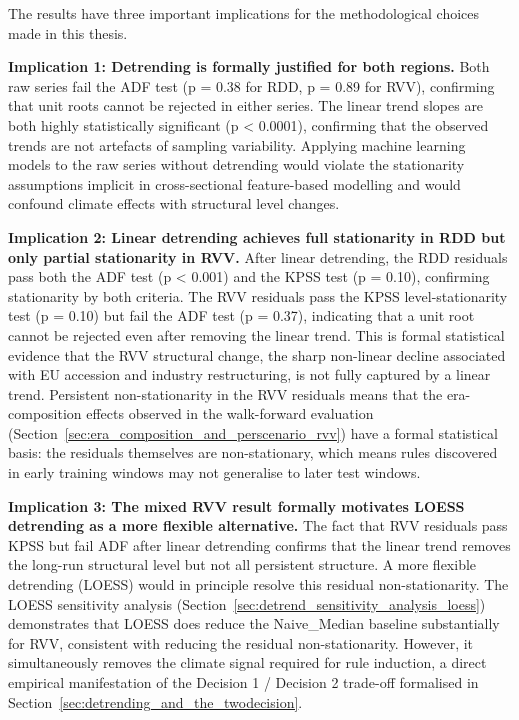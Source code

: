 The results have three important implications for the methodological choices made in this thesis.

\textbf{Implication 1: Detrending is formally justified for both regions. }Both raw series fail the ADF test (p = 0.38 for RDD, p = 0.89 for RVV), confirming that unit roots cannot be rejected in either series. The linear trend slopes are both highly statistically significant (p < 0.0001), confirming that the observed trends are not artefacts of sampling variability. Applying machine learning models to the raw series without detrending would violate the stationarity assumptions implicit in cross-sectional feature-based modelling and would confound climate effects with structural level changes.

\textbf{Implication 2: Linear detrending achieves full stationarity in RDD but only partial stationarity in RVV. }After linear detrending, the RDD residuals pass both the ADF test (p < 0.001) and the KPSS test (p = 0.10), confirming stationarity by both criteria. The RVV residuals pass the KPSS level-stationarity test (p = 0.10) but fail the ADF test (p = 0.37), indicating that a unit root cannot be rejected even after removing the linear trend. This is formal statistical evidence that the RVV structural change, the sharp non-linear decline associated with EU accession and industry restructuring, is not fully captured by a linear trend. Persistent non-stationarity in the RVV residuals means that the era-composition effects observed in the walk-forward evaluation (Section~\ref{sec:era_composition_and_perscenario_rvv}) have a formal statistical basis: the residuals themselves are non-stationary, which means rules discovered in early training windows may not generalise to later test windows.

\textbf{Implication 3: The mixed RVV result formally motivates LOESS detrending as a more flexible alternative. }The fact that RVV residuals pass KPSS but fail ADF after linear detrending confirms that the linear trend removes the long-run structural level but not all persistent structure. A more flexible detrending (LOESS) would in principle resolve this residual non-stationarity. The LOESS sensitivity analysis (Section~\ref{sec:detrend_sensitivity_analysis_loess}) demonstrates that LOESS does reduce the Naive\_Median baseline substantially for RVV, consistent with reducing the residual non-stationarity. However, it simultaneously removes the climate signal required for rule induction, a direct empirical manifestation of the Decision 1 / Decision 2 trade-off formalised in Section~\ref{sec:detrending_and_the_twodecision}.

